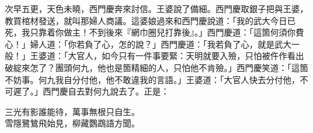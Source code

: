 次早五更，天色未曉，西門慶奔來討信。王婆說了備細。西門慶取銀子把與王婆，教買棺材發送，就叫那婦人商議。這婆娘過來和西門慶說道：「我的武大今日已死，我只靠着你做主！不到後來『網巾圈兒打靠後』。」西門慶道：「這箇何須你費心！」婦人道：「你若負了心，怎的說？」西門慶道：「我若負了心，就是武大一般！」{}王婆道：「大官人，如今只有一件事要緊：天明就要入殮，只怕被仵作看出破綻來怎了？團頭何九，他也是箇精細的人，只怕他不肯殮。」西門慶笑道：「這箇不妨事。何九我自分付他，他不敢違我的言語。」王婆道：「大官人快去分付他，不可遲了。」西門慶自去對何九說去了。正是：

\begin{myquote} 
三光有影誰能待，萬事無根只自生。\\雪隱鷺鷥飛始見，柳藏鸚鵡語方聞。
\end{myquote} 

